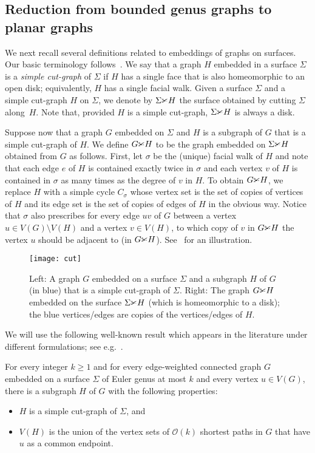 \subsection{Reduction from bounded genus graphs to planar graphs}


We next recall several definitions related to embeddings of graphs on surfaces.
Our basic terminology follows~\cite{MoharT01grap}.
We say that a graph $H$ embedded in a surface $\Sigma$ is a {\em{simple cut-graph}} of $\Sigma$ if $H$ has a single face that is also homeomorphic to an open disk; equivalently, $H$ has a single facial walk.
Given a surface $\Sigma$ and a simple cut-graph $H$ on $\Sigma$, we denote by $\Sigma\cutgraph H$ the surface obtained by cutting $\Sigma$ along~$H$. Note that, provided $H$ is a simple cut-graph, $\Sigma\cutgraph H$ is always a disk.

Suppose now that a graph $G$ embedded on  $\Sigma$ and $H$ is a subgraph of $G$ that is a simple cut-graph of $H$.
We define $G\cutgraph H$ to be the graph embedded on $\Sigma\cutgraph H$ obtained from $G$ as follows.
First, let $\sigma$ be the (unique) facial walk of $H$ and note that each edge $e$ of $H$ is contained exactly twice in $\sigma$ and each vertex $v$ of $H$ is contained in $\sigma$ as many times as the degree of $v$ in $H$.
To obtain $G\cutgraph H$, we replace $H$ with a simple cycle $C_\sigma$ whose vertex set is the set of copies of vertices of $H$ and its edge set is the set of copies of edges of $H$ in the obvious way. Notice that $\sigma$ also prescribes for every edge $uv$ of $G$ between a vertex $u\in V(G)\setminus V(H)$ and a vertex $v\in V(H)$, to which copy of $v$ in $G\cutgraph H$ the vertex $u$ should be adjacent to (in $G\cutgraph H$).
See~ for an illustration.

\begin{figure}[ht]
  \centering
  \texttt{[image: cut]}
  \caption{Left: A graph $G$ embedded on a surface $\Sigma$ and a subgraph $H$ of $G$ (in blue) that is a simple cut-graph of $\Sigma$. Right: The graph $G\cutgraph H$ embedded on the surface $\Sigma\cutgraph H$ (which is homeomorphic to a disk); the blue vertices/edges are copies of the vertices/edges of $H$.}
  \label{fig:cutopen}
\end{figure}

We will use the following well-known result which appears in the literature under different formulations; see e.g.~\cite{BorradaileDT14,CabelloCL12algo,EricksonW05}.

\begin{lemma}\label{lem:genuscut}
  For every integer $k\ge 1$ and for every edge-weighted connected graph $G$ embedded on a surface $\Sigma$ of Euler genus at most $k$ and every vertex $u\in V(G)$, there is a subgraph $H$ of $G$ with the following properties:
  \begin{itemize}[nosep]
    \item  $H$ is a simple cut-graph of $\Sigma$, and
    \item  $V(H)$ is the union of the vertex sets of $\mathcal{O}(k)$ shortest paths in $G$ that have $u$ as a common endpoint.
  \end{itemize}
  \end{lemma}

